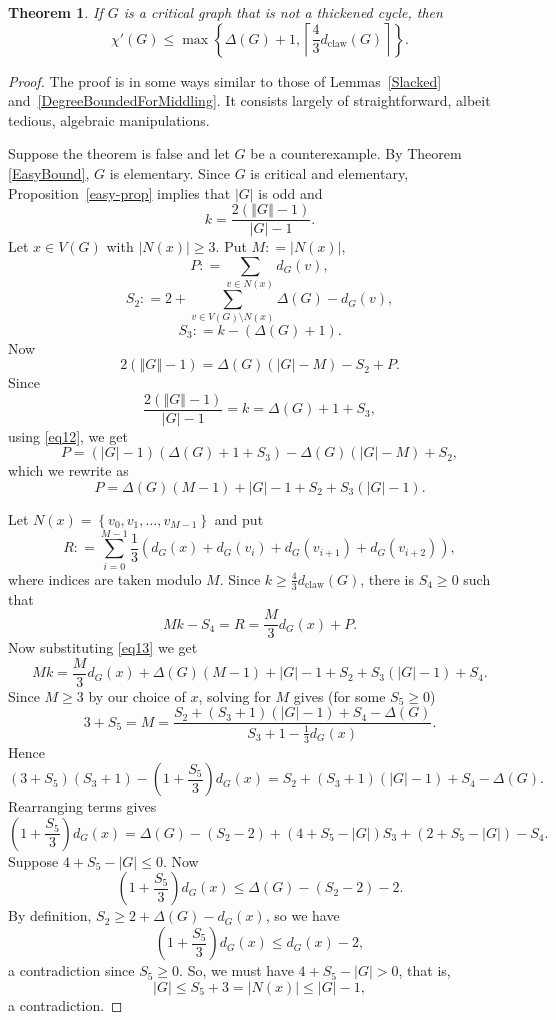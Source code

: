 \documentclass[12pt]{article}
\theoremstyle{plain}
\newtheorem{thm}{Theorem}
\theoremstyle{definition}
\theoremstyle{remark}
\newcommand{\set}[1]{\left\{ #1 \right\}}
\newcommand{\card}[1]{\left|#1\right|}
\newcommand{\size}[1]{\left\Vert#1\right\Vert}
\newcommand{\ceil}[1]{\left\lceil#1\right\rceil}
\newcommand{\parens}[1]{\left( #1 \right)}
\newcommand{\DefinedAs}{\mathrel{\mathop:}=}
\newcommand{\dclaw}[1]{d_{\text{claw}}\left( #1 \right)}
\begin{document}
\begin{thm}
\label{EasyBound2}
If $G$ is a critical graph that is not a thickened cycle, then
\[\chi'(G) \le \max\set{\Delta(G) + 1, \ceil{\frac43\dclaw{G}}}.\]
\end{thm}
\begin{proof}
The proof is in some ways similar to those of Lemmas~\ref{Slacked}
and~\ref{DegreeBoundedForMiddling}.  It consists largely of straightforward,
albeit tedious, algebraic manipulations.

Suppose the theorem is false and let $G$ be a counterexample. By Theorem
\ref{EasyBound}, $G$ is elementary.
Since $G$ is critical and elementary, Proposition~\ref{easy-prop} implies that
$\card{G}$ is odd and
\begin{equation}\label{eq11}
k = \frac{2(\size{G} - 1)}{\card{G} - 1}.
\end{equation}
Let $x \in V(G)$ with $\card{N(x)} \ge 3$. Put $M \DefinedAs \card{N(x)}$, 
\[P \DefinedAs \sum_{v \in N(x)} d_G(v),\]
\[S_2 \DefinedAs 2 + \sum_{v \in V(G) \setminus N(x)} \Delta(G) - d_G(v),\]
\[S_3 \DefinedAs k - (\Delta(G) + 1).\] 
Now
\begin{equation}\label{eq12}
2(\size{G} - 1) = \Delta(G)(\card{G} - M) - S_2 + P.
\end{equation}
Since 
\[\frac{2(\size{G} - 1)}{\card{G} - 1} = k = \Delta(G) + 1 + S_3,\]
using \eqref{eq12}, we get
\[P = (\card{G} - 1)(\Delta(G) + 1 + S_3) - \Delta(G)(\card{G} - M) + S_2,\]
which we rewrite as
\begin{equation}\label{eq13}
P = \Delta(G)(M-1) + \card{G} - 1 + S_2 + S_3(\card{G} - 1).
\end{equation}

Let $N(x) = \set{v_0, v_1, \ldots, v_{M-1}}$ and put
\[R \DefinedAs \sum_{i=0}^{M - 1} \frac13 \parens{d_G(x) + d_G(v_i) + d_G(v_{i+1}) + d_G(v_{i+2})},\]
where indices are taken modulo $M$.  Since $k \ge \frac43\dclaw{G}$, there is $S_4 \ge 0$ such that
\[Mk - S_4 = R = \frac{M}{3}d_G(x) + P.\]
Now substituting \eqref{eq13} we get
\[Mk = \frac{M}{3}d_G(x) + \Delta(G)(M-1) + \card{G} - 1 + S_2 + S_3(\card{G} - 1) + S_4.\]
Since $M\ge 3$ by our choice of $x$, 
solving for $M$ gives (for some $S_5 \ge 0$)
\[3 + S_5 = M =  \frac{S_2 + (S_3 + 1)(\card{G} - 1) + S_4 -\Delta(G)}{S_3 + 1
- \frac13d_G(x)}. \]
Hence
\[(3 + S_5)(S_3 + 1) - \parens{1 + \frac{S_5}{3}}d_G(x) = S_2 + (S_3 +
1)(\card{G} - 1) + S_4 -\Delta(G).\]
Rearranging terms gives
\[\parens{1 + \frac{S_5}{3}}d_G(x) = \Delta(G)  - (S_2 - 2) + \parens{4 + S_5 -
\card{G}}S_3 + \parens{2 + S_5 - \card{G}} - S_4.\]
Suppose $4 + S_5 - \card{G} \le 0$.  Now
\[\parens{1 + \frac{S_5}{3}}d_G(x) \le \Delta(G)  - (S_2 - 2) - 2.\]
By definition, $S_2 \ge 2 + \Delta(G) - d_G(x)$, so we have
\[\parens{1 + \frac{S_5}{3}}d_G(x) \le d_G(x) - 2,\]
a contradiction since $S_5 \ge 0$.  So, we must have $4 + S_5 - \card{G} > 0$, that is, 
\[\card{G} \le S_5 + 3 = \card{N(x)} \le \card{G} - 1,\] a contradiction.
\end{proof}
\end{document}
